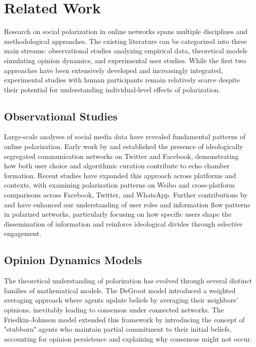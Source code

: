 \section{Related Work}

Research on social polarization in online networks spans multiple disciplines and methodological approaches. The existing literature can be categorized into three main streams: observational studies analyzing empirical data, theoretical models simulating opinion dynamics, and experimental user studies. While the first two approaches have been extensively developed and increasingly integrated, experimental studies with human participants remain relatively scarce despite their potential for understanding individual-level effects of polarization.

\subsection{Observational Studies}

Large-scale analyses of social media data have revealed fundamental patterns of online polarization. Early work by \citep{conover_political_2011} and \citep{bakshy_exposure_2015} established the presence of ideologically segregated communication networks on Twitter and Facebook, demonstrating how both user choice and algorithmic curation contribute to echo chamber formation. Recent studies have expanded this approach across platforms and contexts, with \citep{xing_research_2022} examining polarization patterns on Weibo and \citep{yarchi_political_2021} cross-platform comparisons across Facebook, Twitter, and WhatsApp. Further contributions by \citep{jiang_political_2020} and \citep{recuero_using_2019} have enhanced our understanding of user roles and information flow patterns in polarized networks, particularly focusing on how specific users shape the dissemination of information and reinforce ideological divides through selective engagement.

\subsection{Opinion Dynamics Models}
The theoretical understanding of polarization has evolved through several distinct families of mathematical models. The DeGroot model \citep{degroot_reaching_1974} introduced a weighted averaging approach where agents update beliefs by averaging their neighbors' opinions, inevitably leading to consensus under connected networks. The Friedkin-Johnson model \citep{friedkin_social_1990} extended this framework by introducing the concept of "stubborn" agents who maintain partial commitment to their initial beliefs, accounting for opinion persistence and explaining why consensus might not occur.

